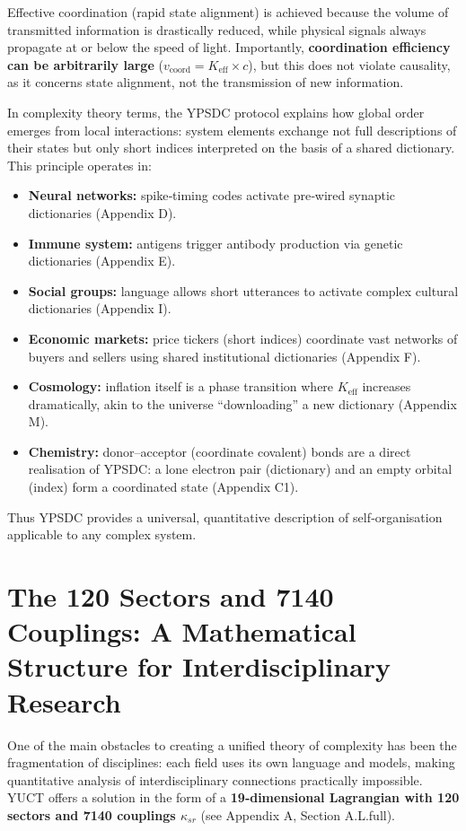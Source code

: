 \documentclass[11pt]{article}
\theoremstyle{remark}
\newcommand{\Keff}{K_{\mathrm{eff}}}
\begin{document}
	Effective coordination (rapid state alignment) is achieved because the volume of transmitted information is drastically reduced, while physical signals always propagate at or below the speed of light. Importantly, \textbf{coordination efficiency can be arbitrarily large} ($v_{\text{coord}} = \Keff \times c$), but this does not violate causality, as it concerns state alignment, not the transmission of new information.
	
	In complexity theory terms, the YPSDC protocol explains how global order emerges from local interactions: system elements exchange not full descriptions of their states but only short indices interpreted on the basis of a shared dictionary. This principle operates in:
	\begin{itemize}
		\item \textbf{Neural networks:} spike‑timing codes activate pre‑wired synaptic dictionaries (Appendix D).
		\item \textbf{Immune system:} antigens trigger antibody production via genetic dictionaries (Appendix E).
		\item \textbf{Social groups:} language allows short utterances to activate complex cultural dictionaries (Appendix I).
		\item \textbf{Economic markets:} price tickers (short indices) coordinate vast networks of buyers and sellers using shared institutional dictionaries (Appendix F).
		\item \textbf{Cosmology:} inflation itself is a phase transition where $\Keff$ increases dramatically, akin to the universe “downloading” a new dictionary (Appendix M).
		\item \textbf{Chemistry:} donor–acceptor (coordinate covalent) bonds are a direct realisation of YPSDC: a lone electron pair (dictionary) and an empty orbital (index) form a coordinated state (Appendix C1).
	\end{itemize}
	
	Thus YPSDC provides a universal, quantitative description of self‑organisation applicable to any complex system.
	
	\section{The 120 Sectors and 7140 Couplings: A Mathematical Structure for Interdisciplinary Research}
	\label{sec:sectors}
	
	One of the main obstacles to creating a unified theory of complexity has been the fragmentation of disciplines: each field uses its own language and models, making quantitative analysis of interdisciplinary connections practically impossible. YUCT offers a solution in the form of a \textbf{19‑dimensional Lagrangian with 120 sectors and 7140 couplings $\kappa_{sr}$} (see Appendix A, Section A.L.full).
	
\end{document}
